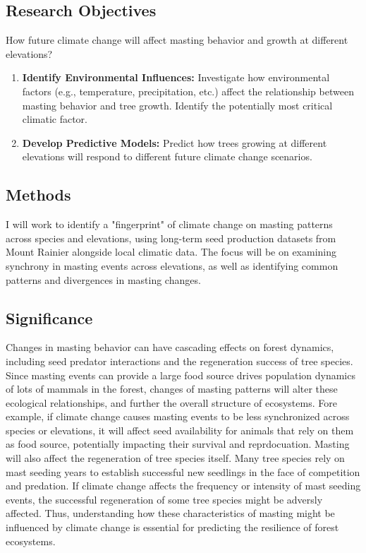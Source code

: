 \documentclass[11pt,letter]{article}
\begin{document}
\subsection{Research Objectives}
How future climate change will affect masting behavior and growth at different elevations?
	\begin{enumerate}
\item \textbf{Identify Environmental Influences:} Investigate how environmental factors (e.g., temperature, precipitation, etc.) affect the relationship between masting behavior and tree growth. Identify the potentially most critical climatic factor.	
\item \textbf{Develop Predictive Models:} Predict how trees growing at different elevations will respond to different future climate change scenarios.		
	\end{enumerate}
\subsection{Methods}
I will work to identify a "fingerprint" of climate change on masting patterns across species and elevations, using long-term seed production datasets from Mount Rainier alongside local climatic data. The focus will be on examining synchrony in masting events across elevations, as well as identifying common patterns and divergences in masting changes.
\subsection{Significance}
Changes in masting behavior can have cascading effects on forest dynamics, including seed predator interactions and the regeneration success of tree species. Since masting events can provide a large food source drives population dynamics of lots of mammals in the forest, changes of masting patterns will alter these ecological relationships, and further the overall structure of ecosystems. Fore example, if climate change causes masting events to be less synchronized across species or elevations, it will affect seed availability for animals that rely on them as food source, potentially impacting their survival and reprdocuation.
Masting will also affect the regeneration of tree species itself. Many tree species rely on mast seeding years to establish successful new seedlings in the face of competition and predation. If climate change affects the frequency or intensity of mast seeding events, the successful regeneration of some tree species might be adversly affected. Thus, understanding how these characteristics of masting might be influenced by climate change is essential for predicting the resilience of forest ecosystems.

 
\end{document}
